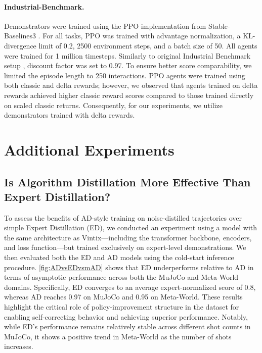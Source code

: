 \documentclass{article}
\theoremstyle{plain}
\theoremstyle{definition}
\theoremstyle{remark}
\begin{document}
\paragraph{Industrial-Benchmark.} Demonstrators were trained using the PPO implementation from Stable-Baselines3 \cite{stable-baselines3}. For all tasks, PPO was trained with advantage normalization, a KL-divergence limit of 0.2, 2500 environment steps, and a batch size of 50. All agents were trained for 1 million timesteps. Similarly to original Industrial Benchmark setup \cite{Hein_2017}, discount factor was set to 0.97. To ensure better score comparability, we limited the episode length to 250 interactions. PPO agents were trained using both classic and delta rewards; however, we observed that agents trained on delta rewards achieved higher classic reward scores compared to those trained directly on scaled classic returns. Consequently, for our experiments, we utilize demonstrators trained with delta rewards.
\section{Additional Experiments}
\subsection{Is Algorithm Distillation More Effective Than Expert Distillation?}
To assess the benefits of AD-style training on noise-distilled trajectories over simple Expert Distillation (ED), we conducted an experiment using a model with the same architecture as Vintix—including the transformer backbone, encoders, and loss function—but trained exclusively on expert-level demonstrations. We then evaluated both the ED and AD models using the cold-start inference procedure.
\cref{fig:ADvsEDvsmAD} shows that ED underperforms relative to AD in terms of asymptotic performance across both the MuJoCo and Meta-World domains. Specifically, ED converges to an average expert-normalized score of 0.8, whereas AD reaches 0.97 on MuJoCo and 0.95 on Meta-World.
These results highlight the critical role of policy-improvement structure in the dataset for enabling self-correcting behavior and achieving superior performance. Notably, while ED’s performance remains relatively stable across different shot counts in MuJoCo, it shows a positive trend in Meta-World as the number of shots increases.
\end{document}

